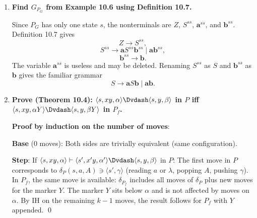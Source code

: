 \begin{enumerate}[{10.}1. ]
\begin{enumerate}
\item \textbf{Counting automaton}: No. The union still contains the sublanguage
\[
\{\pmb{a}^{n+1}\pmb{b}^n\pmb{c}^n\pmb{d}^{n+1}\mid n\geq 0\},
\]
which lies only in the second half. Accepting that family already requires the
machine to preserve the outer $\pmb{a}$-count while separately matching the
middle $\pmb{b}/\pmb{c}$ count. As in Exercise~10.11(d), a one-symbol stack
cannot mark the boundary between those two pieces of information.

\item \textbf{Grammar from PDA}: An equivalent grammar is
\[
S\rightarrow AB\mid C,
\]
\[
A\rightarrow \pmb{a}A\pmb{b}\mid \lambda,\qquad
B\rightarrow \pmb{c}B\pmb{d}\mid \lambda,
\]
\[
C\rightarrow \pmb{a}C\pmb{d}\mid T,\qquad
T\rightarrow \pmb{b}T\pmb{c}\mid \lambda.
\]
\end{enumerate}

\item \textbf{Find $G_{P_G}$ from Example 10.6 using Definition 10.7.}

Since $P_G$ has only one state $s$, the nonterminals are $Z$, $S^{ss}$, $\pmb{a}^{ss}$, and $\pmb{b}^{ss}$. Definition 10.7 gives
\[
Z\rightarrow S^{ss},
\]
\[
S^{ss}\rightarrow \pmb{a}S^{ss}\pmb{b}^{ss}\mid \pmb{a}\pmb{b}^{ss},
\]
\[
\pmb{b}^{ss}\rightarrow \pmb{b}.
\]
The variable $\pmb{a}^{ss}$ is useless and may be deleted. Renaming $S^{ss}$ as $S$ and $\pmb{b}^{ss}$ as $\pmb{b}$ gives the familiar grammar
\[
S\rightarrow \pmb{a}S\pmb{b}\mid \pmb{ab}.
\]

\item \textbf{Prove (Theorem 10.4): $\langle s,xy,\alpha\rangle\Dvdash\langle s,y,\beta\rangle$ in $P$ iff $\langle s,xy,\alpha Y\rangle\Dvdash\langle s,y,\beta Y\rangle$ in $P_f$.}

\textbf{Proof by induction on the number of moves}:

\textbf{Base} (0 moves): Both sides are trivially equivalent (same configuration).

\textbf{Step}: If $\langle s,xy,\alpha\rangle\vdash\langle s',x'y,\alpha'\rangle\Dvdash\langle s,y,\beta\rangle$ in $P$:
The first move in $P$ corresponds to $\delta_P(s,a,A)\ni\langle s',\gamma\rangle$ (reading $a$ or $\lambda$, popping $A$, pushing $\gamma$). In $P_f$, the same move is available: $\delta_{P_f}$ includes all moves of $\delta_P$ plus new moves for the marker $Y$. The marker $Y$ sits below $\alpha$ and is not affected by moves on $\alpha$. By IH on the remaining $k-1$ moves, the result follows for $P_f$ with $Y$ appended. \qed


\end{enumerate}
